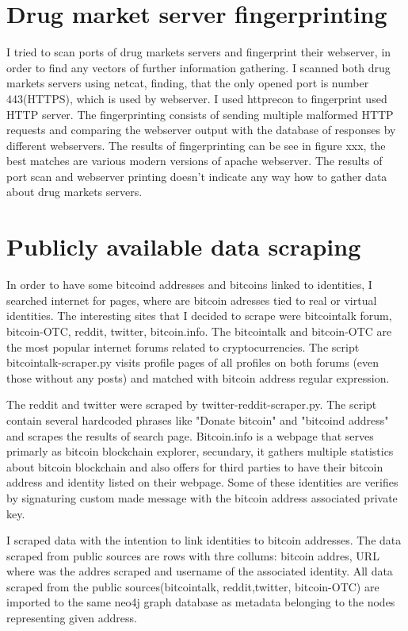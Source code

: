 \documentclass[
  digital, %
  table,   %
  lof,     %
  lot,     %
  oneside
]{fithesis3}
\begin{document}
\section{Drug market server fingerprinting}
I tried to scan ports of drug markets servers and fingerprint their webserver, in order to find any vectors of further information gathering.
I scanned both drug markets servers using netcat, finding, that the only opened port is number 443(HTTPS), which is used by webserver.
I used httprecon to fingerprint used HTTP server. The fingerprinting consists of sending multiple malformed HTTP requests and comparing the webserver output with the database of responses by different webservers.
The results of fingerprinting can be see in figure xxx, the best matches are various modern versions of apache webserver.
The results of port scan and webserver printing doesn't indicate any way how to gather data about drug markets servers.

\section{Publicly available data scraping}
In order to have some bitcoind addresses and bitcoins linked to identities, I searched internet for pages, where are bitcoin adresses tied to real or virtual identities.
The interesting sites that I decided to scrape were bitcointalk forum, bitcoin-OTC, reddit, twitter, bitcoin.info.
The bitcointalk and bitcoin-OTC are the most popular internet forums related to cryptocurrencies. The script bitcointalk-scraper.py visits profile pages of all profiles on both forums (even those without any posts)
 and matched with bitcoin address regular expression.
 
The reddit and twitter were scraped by twitter-reddit-scraper.py. The script contain several hardcoded phrases like "Donate bitcoin" and "bitcoind address" and scrapes the results of search page.
Bitcoin.info is a webpage that serves primarly as bitcoin blockchain explorer, secundary,
it gathers multiple statistics about bitcoin blockchain and also offers for third parties to have their bitcoin address and identity listed on their webpage.
Some of these identities are verifies by signaturing custom made message with the bitcoin address associated private key.

I scraped data with the intention to link identities to bitcoin addresses. The data scraped from public sources are rows with thre collums: bitcoin addres, URL where was the addres scraped and username of the associated identity.
All data scraped from the public sources(bitcointalk, reddit,twitter, bitcoin-OTC) are imported to the same neo4j graph database as metadata belonging to the nodes representing given address.
\end{document}
